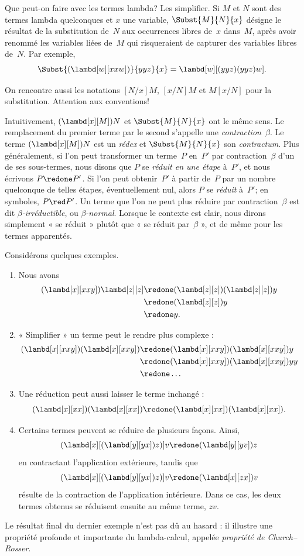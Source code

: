 \documentclass[../../../include/open-logic-section]{subfiles}
\begin{document}

Que peut-on faire avec les termes lambda?
Les simplifier. Si $M$ et $N$ sont des termes
lambda quelconques et $x$ une variable,
$\Subst{M}{N}{x}$ désigne le résultat de la
substitution de~$N$ aux occurrences libres de~$x$ dans~$M$, après
avoir renommé les variables liées de~$M$
qui risqueraient de capturer des variables
libres de~$N$. Par exemple,
\[
\Subst{(\lambd[w][xxw])}{yyz}{x}
=\lambd[w][(yyz)(yyz)w].
\]

\begin{digress}
On rencontre aussi les notations $[N/x]M$,
$[x/N]M$ et $M[x/N]$ pour la substitution.
Attention aux conventions!
\end{digress}

Intuitivement, $(\lambd[x][M])N$ et
$\Subst{M}{N}{x}$ ont le même sens. Le
remplacement du premier terme par le second
s'appelle une \emph{contraction~$\beta$}.
Le terme $(\lambd[x][M])N$ est un
\emph{rédex} et $\Subst{M}{N}{x}$ son
\emph{contractum}. Plus généralement, si
l'on peut transformer un terme~$P$ en~$P'$
par contraction~$\beta$ d'un de ses
sous-termes, nous disons que $P$ se
\emph{réduit en une étape} à~$P'$, et nous
écrivons $P\redone P'$. Si l'on peut
obtenir~$P'$ à partir de~$P$ par un nombre
quelconque de telles étapes, éventuellement
nul, alors $P$ se \emph{réduit} à~$P'$;
en symboles, $P\red P'$. Un terme que l'on
ne peut plus réduire par contraction~$\beta$
est dit \emph{$\beta$-irréductible}, ou
\emph{$\beta$-normal}. Lorsque le contexte
est clair, nous dirons simplement « se
réduit » plutôt que « se réduit par~$\beta$ »,
et de même pour les termes apparentés.

Considérons quelques exemples.
\begin{enumerate}
\item Nous avons
\begin{align*}
(\lambd[x][xxy]) \lambd[z][z] & \redone (\lambd[z][z])(\lambd[z][z]) y \\
& \redone (\lambd[z][z]) y \\
& \redone y.
\end{align*}
\item « Simplifier » un terme peut le rendre
      plus complexe :
\begin{align*}
(\lambd[x][xxy])(\lambd[x][xxy]) & \redone (\lambd[x][xxy])(\lambd[x][xxy])y \\
& \redone (\lambd[x][xxy])(\lambd[x][xxy])yy \\
& \redone \dots
\end{align*}
\item Une réduction peut aussi laisser le
      terme inchangé :
\[
(\lambd[x][xx])(\lambd[x][xx])
\redone (\lambd[x][xx])(\lambd[x][xx]).
\]
\item Certains termes peuvent se réduire
      de plusieurs façons. Ainsi,
\[
(\lambd[x][(\lambd[y][yx]) z)] v
\redone (\lambd[y][yv]) z
\]
      en contractant l'application extérieure,
      tandis que
\[
(\lambd[x][(\lambd[y][yx]) z)] v
\redone (\lambd[x][zx]) v
\]
      résulte de la contraction de
      l'application intérieure. Dans ce cas,
      les deux termes obtenus se réduisent
      ensuite au même terme, $zv$.
\end{enumerate}

Le résultat final du dernier exemple n'est
pas dû au hasard : il illustre une propriété
profonde et importante du lambda-calcul,
appelée \emph{propriété de Church--Rosser}.
\end{document}
